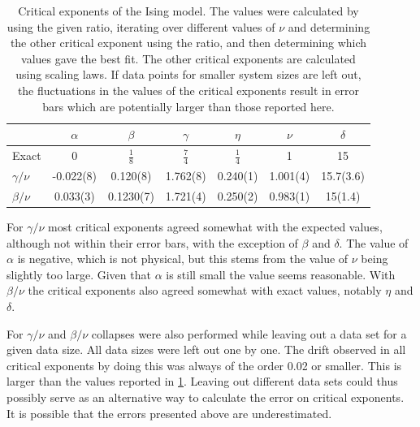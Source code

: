 \documentclass[11pt, a4paper]{report} %
\begin{document}
\begin{table}[htb]
	\centering
	\renewcommand{\arraystretch}{1.5}
	\begin{tabular}{l | c c c c c c}
		\hline
		& \(\alpha\) & \(\beta\) & \(\gamma\) & \(\eta\) & \(\nu\) & \(\delta\) \\\hline
		Exact & 0 & \(\frac{1}{8}\) & \(\frac{7}{4}\) & \(\frac{1}{4}\) & 1 & 15 \\
		\(\gamma/\nu\) & -0.022(8) & 0.120(8) & 1.762(8) & 0.240(1) & 1.001(4) & 15.7(3.6) \\
		\(\beta/\nu\) & 0.033(3) & 0.1230(7) & 1.721(4) & 0.250(2) & 0.983(1) & 15(1.4)\\\hline
	\end{tabular}
	\caption{Critical exponents of the Ising model. The values were calculated by using the given ratio, iterating over different values of \(\nu\) and determining the other critical exponent using the ratio, and then determining which values gave the best fit. The other critical exponents are calculated using scaling laws.
	If data points for smaller system sizes are left out, the fluctuations in the values of the critical exponents result in error bars which are potentially larger than those reported here.
	}
	\label{tab:ising_critical_exponents}
\end{table}

For \(\gamma/\nu\) most critical exponents agreed somewhat with the expected values, although not within their error bars, with the exception of \(\beta\) and \(\delta\).
The value of \(\alpha\) is negative, which is not physical, but this stems from the value of \(\nu\) being slightly too large.
Given that \(\alpha\) is still small the value seems reasonable.
With \(\beta/\nu\) the critical exponents also agreed somewhat with exact values, notably \(\eta\) and \(\delta\).

For \(\gamma/\nu\) and \(\beta /\nu\) collapses were also performed while leaving out a data set for a given data size.
All data sizes were left out one by one.
The drift observed in all critical exponents by doing this was always of the order 0.02 or smaller.
This is larger than the values reported in \cref{tab:ising_critical_exponents}.
Leaving out different data sets could thus possibly serve as an alternative way to calculate the error on critical exponents.
It is possible that the errors presented above are underestimated.
\end{document}
